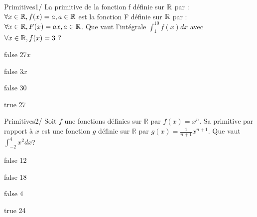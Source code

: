         	\begin{question}{60}{Primitives}{1}{/}
				La primitive de la fonction f définie sur $\mathbb {R} $ par : $\forall x \in \mathbb {R} , f(x)=a, a \in \mathbb {R} $ est la fonction F définie sur $\mathbb {R} $ par : $\forall x \in \mathbb {R} , F(x)=ax, a \in \mathbb {R}  $. Que vaut l'intégrale $\int_{1}^{10} f(x) dx$ avec $\forall x \in \mathbb {R} , f(x)=3$ ? 
            \end{question}
            \begin{reponses}
            	\item[false] $27x$
            	\item[false] $3x$
                \item[false] 30
                \item[true] 27
            \end{reponses}
            \begin{question}{60}{Primitives}{2}{/}
                Soit $f$ une fonctions définies sur $\mathbb{R}$ par $f(x)=x^n$. Sa primitive par rapport à $x$ est une fonction $g$ définie sur $\mathbb{R}$ par $g(x)=\frac{1}{n+1}x^{n+1}$. Que vaut $\int_{-2}^4 x^2 dx$?
            \end{question}
            \begin{reponses}
                \item[false] 12
                \item[false] 18
                \item[false] 4
                \item[true] 24
            \end{reponses}
